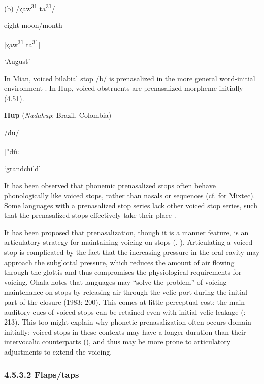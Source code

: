 (b)  /ʐaw\textsuperscript{31}   ta\textsuperscript{31}/

  eight   moon/month

  [ʐaw\textsuperscript{31} ta\textsuperscript{31}]

  ‘August’

\citep[40]{Shen2003}

\z

  In Mian, voiced bilabial stop /b/ is prenasalized in the more general word-initial environment \citep{Fedden2007}. In Hup, voiced obstruents are prenasalized morpheme-initially (4.51).

\ea\label{ex:(4.51)}
  \textbf{Hup} (\textit{Nadahup}; Brazil, Colombia)

/du/

[\textsuperscript{n}dûː]

‘grandchild’

\citep[54]{Epps2008}

\z

  It has been observed that phonemic prenasalized stops often behave phonologically like voiced stops, rather than nasals or sequences (cf. \citealt{IversonSalmons1996} for Mixtec). Some languages with a prenasalized stop series lack other voiced stop series, such that the prenasalized stops effectively take their place \citep[67-8]{Maddieson1984}.

  It has been proposed that prenasalization, though it is a manner feature, is an articulatory strategy for maintaining voicing on stops (\citealt{Ohala1983}, \citealt{HentonEtAl1992}). Articulating a voiced stop is complicated by the fact that the increasing pressure in the oral cavity may approach the subglottal pressure, which reduces the amount of air flowing through the glottis and thus compromises the physiological requirements for voicing. Ohala notes that languages may “solve the problem” of voicing maintenance on stops by releasing air through the velic port during the initial part of the closure (1983: 200). This comes at little perceptual cost: the main auditory cues of voiced stops can be retained even with initial velic leakage (\citealt{OhalaOhala1991}: 213). This too might explain why phonetic prenasalization often occurs domain-initially: voiced stops in these contexts may have a longer duration than their intervocalic counterparts (\citealt{FlegeBrown1982}), and thus may be more prone to articulatory adjustments to extend the voicing.

\subsubsection{\textbf{4.5.3.2} \textbf{Flaps/taps} }

